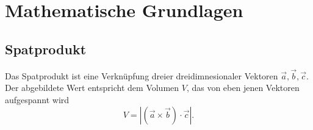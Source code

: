 \documentclass{article}
\newcommand{\diff}{\mathrm{d}}
\begin{document}
%
%


\newpage


\section{Mathematische Grundlagen}
\subsection{Spatprodukt}
Das Spatprodukt ist eine Verknüpfung dreier dreidimnesionaler Vektoren $\vec{a}, \vec{b}, \vec{c}$. Der abgebildete Wert entspricht dem Volumen $V$, das von eben jenen Vektoren aufgespannt wird
	\begin{equation}
		V = | (\vec{a} \times \vec{b}) \cdot \vec{c} |.
	\end{equation}
\end{document}
